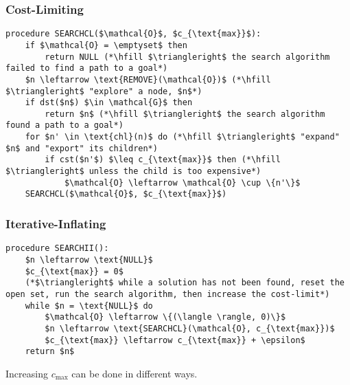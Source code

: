 \subsubsection{Cost-Limiting}
\begin{algo}

\begin{lstlisting}
procedure SEARCHCL($\mathcal{O}$, $c_{\text{max}}$):
    if $\mathcal{O} = \emptyset$ then
        return NULL (*\hfill $\triangleright$ the search algorithm failed to find a path to a goal*)
    $n \leftarrow \text{REMOVE}(\mathcal{O})$ (*\hfill $\triangleright$ "explore" a node, $n$*)
    if dst($n$) $\in \mathcal{G}$ then
        return $n$ (*\hfill $\triangleright$ the search algorithm found a path to a goal*)
    for $n' \in \text{chl}(n)$ do (*\hfill $\triangleright$ "expand" $n$ and "export" its children*)
        if cst($n'$) $\leq c_{\text{max}}$ then (*\hfill $\triangleright$ unless the child is too expensive*)
            $\mathcal{O} \leftarrow \mathcal{O} \cup \{n'\}$
    SEARCHCL($\mathcal{O}$, $c_{\text{max}}$)
\end{lstlisting}

\end{algo}
\newpage

\subsubsection{Iterative-Inflating}
\begin{algo}
\begin{lstlisting}
procedure SEARCHII():
    $n \leftarrow \text{NULL}$
    $c_{\text{max}} = 0$
    (*$\triangleright$ while a solution has not been found, reset the open set, run the search algorithm, then increase the cost-limit*)
    while $n = \text{NULL}$ do
        $\mathcal{O} \leftarrow \{(\langle \rangle, 0)\}$
        $n \leftarrow \text{SEARCHCL}(\mathcal{O}, c_{\text{max}})$
        $c_{\text{max}} \leftarrow c_{\text{max}} + \epsilon$
    return $n$
\end{lstlisting}

\end{algo}

\begin{warning}
    Increasing $c_{\text{max}}$ can be done in different ways.
\end{warning}

